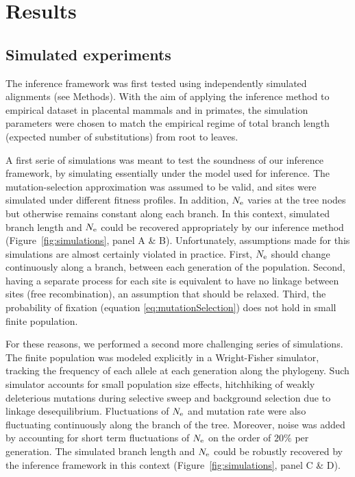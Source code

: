 \section{Results}
\label{sec:Results}

\subsection{Simulated experiments}
\label{sec:ResultsSimulated}
The inference framework was first tested using independently simulated alignments (see Methods).
With the aim of applying the inference method to empirical dataset in placental mammals and in primates, the simulation parameters were chosen to match the empirical regime of total branch length (expected number of substitutions) from root to leaves.

A first serie of simulations was meant to test the soundness of our inference framework, by simulating essentially under the model used for inference.
The mutation-selection approximation was assumed to be valid, and sites were simulated under different fitness profiles.
In addition, $N_{\mathrm{e}}$ varies at the tree nodes but otherwise remains constant along each branch.
In this context, simulated branch length and $N_{\mathrm{e}}$ could be recovered appropriately by our inference method (Figure~\ref{fig:simulations}, panel A \& B).
Unfortunately, assumptions made for this simulations are almost certainly violated in practice.
First, $N_{\mathrm{e}}$ should change continuously along a branch, between each generation of the population.
Second, having a separate process for each site is equivalent to have no linkage between sites (free recombination), an assumption that should be relaxed. 
Third, the probability of fixation (equation \ref{eq:mutationSelection}) does not hold in small finite population.

For these reasons, we performed a second more challenging series of simulations.
The finite population was modeled explicitly in a Wright-Fisher simulator, tracking the frequency of each \gls{allele} at each generation along the phylogeny.
Such simulator accounts for small population size effects, hitchhiking of weakly deleterious mutations during selective sweep and background selection due to linkage desequilibrium.
Fluctuations of $N_{\mathrm{e}}$ and mutation rate were also fluctuating continuously along the branch of the tree.
Moreover, noise was added by accounting for short term fluctuations of $N_{\mathrm{e}}$ on the order of $20\%$ per generation.
The simulated branch length and $N_{\mathrm{e}}$ could be robustly recovered by the inference framework in this context (Figure~\ref{fig:simulations}, panel C \& D).

